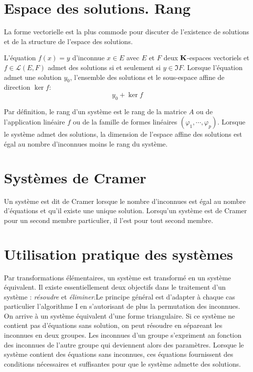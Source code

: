 \section{Espace des solutions. Rang}
La forme vectorielle est la plus commode pour discuter de l'existence de solutions et de la structure de l'espace des solutions.
\begin{prop}
 L'équation $f(x)=y$ d'inconnue $x\in E$ avec $E$ et $F$ deux $\mathbf{K}$-espaces vectoriels et $f\in\mathcal L(E,F)$ admet des solutions si et seulement si $y\in \Im F$. Lorsque l'équation admet une solution $y_0$, l'ensemble des solutions et le sous-espace affine de direction $\ker f$:
\begin{displaymath}
 y_0 + \ker f
\end{displaymath}
\end{prop}
Par définition, le rang d'un système est le rang de la matrice $A$ ou de l'application linéaire $f$ ou de la famille de formes linéaires $(\varphi_1,\cdots,\varphi_p)$.\newline
Lorsque le système admet des solutions, la dimension de l'espace affine des solutions est égal au nombre d'inconnues moins le rang du système.
\section{Systèmes de Cramer}
Un système est dit de Cramer lorsque le nombre d'inconnues est égal au nombre d'équations et qu'il existe une unique solution. Lorsqu'un système est de Cramer pour un second membre particulier, il l'est pour tout second membre.
\section{Utilisation pratique des systèmes}
Par transformations élémentaires, un système est transformé en un système équivalent. Il existe essentiellement deux objectifs dans le traitement d'un système : \emph{résoudre} et \emph{éliminer}.Le principe général est d'adapter à chaque cas particulier l'algorithme I en s'autorisant de plus la permutation des inconnues. On arrive à un système équivalent d'une forme triangulaire.\newline
Si ce système ne contient pas d'équations sans solution, on peut résoudre en sépareant les inconnues en deux groupes. Les inconnues d'un groupe s'expriment an fonction des inconnues de l'autre groupe qui deviennent alors des paramètres.\newline
Lorsque le système contient des équations sans inconnues, ces équations fournissent des conditions nécessaires et suffisantes pour que le système admette des solutions.
 


